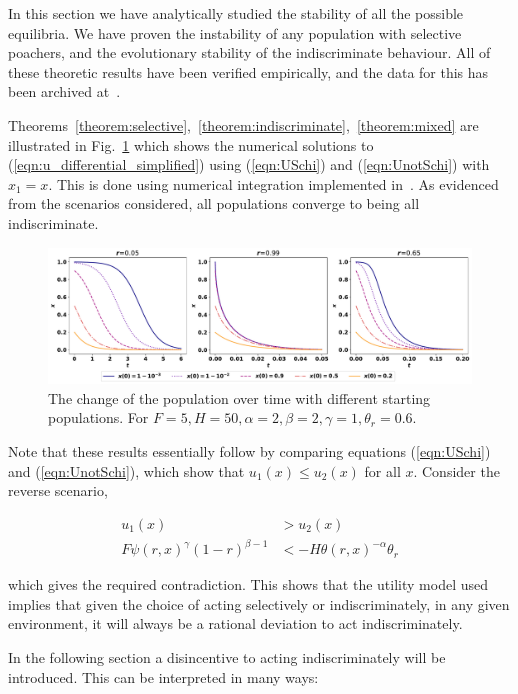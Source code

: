 \documentclass[10pt]{article}
\begin{document}
In this section we have analytically studied the stability of all the possible
equilibria. We have proven the instability of any population with selective
poachers,
and the evolutionary stability of the indiscriminate behaviour.
All of these theoretic results have been verified empirically, and the data for this
has been archived at~\cite{Glynatsi2017}.

Theorems~\ref{theorem:selective},~\ref{theorem:indiscriminate},~\ref{theorem:mixed}
are illustrated in Fig.~\ref{fig:indiscriminate_ess}
which shows the numerical solutions to (\ref{eqn:u_differential_simplified})
using (\ref{eqn:USchi}) and  (\ref{eqn:UnotSchi}) with \(x_1=x\).
This is done using numerical integration implemented  in~\cite{scipy}.
As evidenced from the scenarios considered, all populations converge
to being all indiscriminate.

\begin{figure}[!htbp]
    \includegraphics[width=\textwidth]{images/IndiscriminateESS.pdf}
    \caption{\label{fig:indiscriminate_ess} The change of the population over
    time with different starting populations. For \(F=5, H=50,
    \alpha=2, \beta=2, \gamma=1, \theta_r=0.6\).}
\end{figure}

Note that these results essentially follow by comparing equations (\ref{eqn:USchi})
and (\ref{eqn:UnotSchi}), which show that \(u_1(x) \leq u_2(x)\) for all \(x\).
Consider the reverse scenario,

\begin{align}
    u_1(x) & > u_2(x)\\ 
    F\psi(r, x) ^ {\gamma} (1 - r) ^ {\beta - 1} & < -H \theta(r, x) ^ {-\alpha} \theta_r
\end{align}

\noindent which gives the required contradiction. This shows that the utility model used
implies that given the choice of acting selectively or indiscriminately, in any
given environment, it will always be a rational deviation to act
indiscriminately.

In the following section a disincentive to acting indiscriminately will be
introduced. This can be interpreted in many ways:
\end{document}
